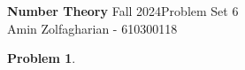 \documentclass[12pt]{article}
\newcommand{\customanswer}[1]{%
\begin{problem}
\end{problem}

}
\newtheorem{problem}{Problem}
\begin{document}
\noindent \textbf{Number Theory} Fall 2024\hfill Problem Set 6\\
Amin Zolfagharian - 610300118

\hrulefill

\customanswer{1}
\end{document}
